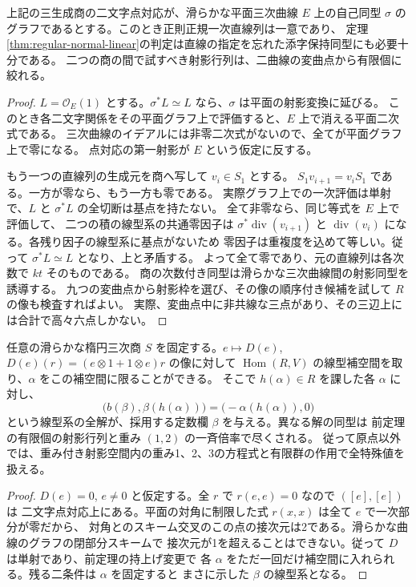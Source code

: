 \begin{theorem}\label{thm:elliptic-central-line}
上記の三生成商の二文字点対応が、滑らかな平面三次曲線 $E$ 上の自己同型
$\sigma$ のグラフであるとする。このとき正則正規一次直線列は一意であり、
定理\ref{thm:regular-normal-linear}の判定は直線の指定を忘れた添字保持同型にも必要十分である。
二つの商の間で試すべき射影行列は、二曲線の変曲点から有限個に絞れる。
\end{theorem}
\begin{proof}
$L=\mathcal O_E(1)$ とする。$\sigma^*L\simeq L$ なら、$\sigma$ は平面の射影変換に延びる。
このとき各二文字関係をその平面グラフ上で評価すると、$E$ 上で消える平面二次式である。
三次曲線のイデアルには非零二次式がないので、全てが平面グラフ上で零になる。
点対応の第一射影が $E$ という仮定に反する。

もう一つの直線列の生成元を商へ写して $v_i\in S_1$ とする。
$S_1 v_{i+1}=v_i S_1$ である。一方が零なら、もう一方も零である。
実際グラフ上での一次評価は単射で、$L$ と $\sigma^*L$ の全切断は基点を持たない。
全て非零なら、同じ等式を $E$ 上で評価して、
二つの積の線型系の共通零因子は $\sigma^*\operatorname{div}(v_{i+1})$ と
$\operatorname{div}(v_i)$ になる。各残り因子の線型系に基点がないため
零因子は重複度を込めて等しい。従って $\sigma^*L\simeq L$ となり、上と矛盾する。
よって全て零であり、元の直線列は各次数で $kt$ そのものである。
商の次数付き同型は滑らかな三次曲線間の射影同型を誘導する。
九つの変曲点から射影枠を選び、その像の順序付き候補を試して $R$ の像も検査すればよい。
実際、変曲点中に非共線な三点があり、その三辺上には合計で高々六点しかない。
\end{proof}

\begin{corollary}\label{cor:elliptic-central-linear-slice}
任意の滑らかな楕円三次商 $S$ を固定する。$e\mapsto D(e)$,
$D(e)(r)=(e\otimes1+1\otimes e)r$ の像に対して
$\operatorname{Hom}(R,V)$ の線型補空間を取り、$\alpha$ をこの補空間に限ることができる。
そこで $h(\alpha)\in R$ を課した各 $\alpha$ に対し、
\[
 \big(b(\beta),\beta(h(\alpha))\big)=\big(-\alpha(h(\alpha)),0\big)
\]
という線型系の全解が、採用する定数欄 $\beta$ を与える。異なる解の同型は
前定理の有限個の射影行列と重み $(1,2)$ の一斉倍率で尽くされる。
従って原点以外では、重み付き射影空間内の重み1、2、3の方程式と有限群の作用で全特殊値を扱える。
\end{corollary}
\begin{proof}
$D(e)=0$, $e\ne0$ と仮定する。全 $r$ で $r(e,e)=0$ なので $([e],[e])$ は
二文字点対応上にある。平面の対角に制限した式 $r(x,x)$ は全て $e$ で一次部分が零だから、
対角とのスキーム交叉のこの点の接次元は2である。滑らかな曲線のグラフの閉部分スキームで
接次元が1を超えることはできない。従って $D$ は単射であり、前定理の持上げ変更で
各 $\alpha$ をただ一回だけ補空間に入れられる。残る二条件は $\alpha$ を固定すると
まさに示した $\beta$ の線型系となる。
\end{proof}

